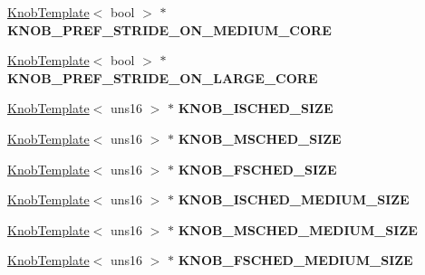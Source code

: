 \begin{DoxyCompactItemize}
\item 
\hypertarget{classall__knobs__c_a5043a351fb630ed7281c77edb9ecafc8}{
\hyperlink{classKnobTemplate}{KnobTemplate}$<$ bool $>$ $\ast$ {\bfseries KNOB\_\-PREF\_\-STRIDE\_\-ON\_\-MEDIUM\_\-CORE}}
\label{classall__knobs__c_a5043a351fb630ed7281c77edb9ecafc8}

\item 
\hypertarget{classall__knobs__c_a2f64e3d36f0ad12a2a2053e9adead7cd}{
\hyperlink{classKnobTemplate}{KnobTemplate}$<$ bool $>$ $\ast$ {\bfseries KNOB\_\-PREF\_\-STRIDE\_\-ON\_\-LARGE\_\-CORE}}
\label{classall__knobs__c_a2f64e3d36f0ad12a2a2053e9adead7cd}

\item 
\hypertarget{classall__knobs__c_addc33dfbc28e13d657f81461f1f43d13}{
\hyperlink{classKnobTemplate}{KnobTemplate}$<$ uns16 $>$ $\ast$ {\bfseries KNOB\_\-ISCHED\_\-SIZE}}
\label{classall__knobs__c_addc33dfbc28e13d657f81461f1f43d13}

\item 
\hypertarget{classall__knobs__c_accf3771d0e389f3083d0da9b69ab712f}{
\hyperlink{classKnobTemplate}{KnobTemplate}$<$ uns16 $>$ $\ast$ {\bfseries KNOB\_\-MSCHED\_\-SIZE}}
\label{classall__knobs__c_accf3771d0e389f3083d0da9b69ab712f}

\item 
\hypertarget{classall__knobs__c_afdc9c08b53a8fedc7968ee2ae659b0fb}{
\hyperlink{classKnobTemplate}{KnobTemplate}$<$ uns16 $>$ $\ast$ {\bfseries KNOB\_\-FSCHED\_\-SIZE}}
\label{classall__knobs__c_afdc9c08b53a8fedc7968ee2ae659b0fb}

\item 
\hypertarget{classall__knobs__c_ab552b03abd7a3362f03a965c70932eb9}{
\hyperlink{classKnobTemplate}{KnobTemplate}$<$ uns16 $>$ $\ast$ {\bfseries KNOB\_\-ISCHED\_\-MEDIUM\_\-SIZE}}
\label{classall__knobs__c_ab552b03abd7a3362f03a965c70932eb9}

\item 
\hypertarget{classall__knobs__c_a0e58f8eeba2567d66701143e27aeb7ca}{
\hyperlink{classKnobTemplate}{KnobTemplate}$<$ uns16 $>$ $\ast$ {\bfseries KNOB\_\-MSCHED\_\-MEDIUM\_\-SIZE}}
\label{classall__knobs__c_a0e58f8eeba2567d66701143e27aeb7ca}

\item 
\hypertarget{classall__knobs__c_aac09082a291581c8a98e4dfcf713dbc7}{
\hyperlink{classKnobTemplate}{KnobTemplate}$<$ uns16 $>$ $\ast$ {\bfseries KNOB\_\-FSCHED\_\-MEDIUM\_\-SIZE}}
\label{classall__knobs__c_aac09082a291581c8a98e4dfcf713dbc7}


\end{DoxyCompactItemize}
